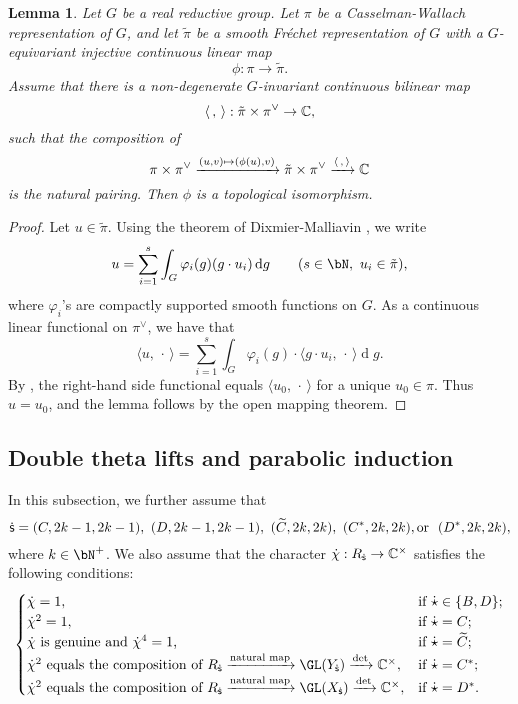 \documentclass[12pt,a4paper]{amsart}
\newcommand{\od}{\operatorname{d}}
\newcommand{\la}{\langle}
\newcommand{\ra}{\rangle}
\newcommand{\be}{\begin {equation}}
\newcommand{\ee}{\end {equation}}
\numberwithin{equation}{section}
\newtheorem{lem}[thm]{Lemma}
\theoremstyle{remark}
\begin{document}
\begin{lem}\label{imb2}
Let $G$ be a real reductive group. Let $\pi$ be a Casselman-Wallach representation of $G$, and let $\tilde \pi$ be a smooth Fr\'echet representation of $G$ with a $G$-equivariant injective continuous linear map
\[
  \phi: \pi\rightarrow \tilde \pi.
\]
Assume that  there is a non-degenerate $G$-invariant continuous bilinear map
\[
\la\,,\,\ra: \tilde \pi\times \pi^\vee\rightarrow \C,
\]
such that the composition of
\[
 \pi\times \pi^\vee\xrightarrow{(u,v)\mapsto (\phi(u),v)} \tilde \pi\times \pi^\vee\xrightarrow{\la\,,\,\ra} \C
\]
is the natural pairing. Then $\phi$ is a topological isomorphism.
\end{lem}
\begin{proof}
 Let $u\in \tilde \pi$.
 Using the theorem of Dixmier-Malliavin \cite[Theorem 3.3]{DM}, we write
 \[
   u=\sum_{i=1}^{s} \int_G \varphi_i(g) ( g\cdot u_i)\od\! g \qquad (s\in \bN, \ u_i\in\tilde \pi),
 \]
 where $\varphi_i$'s are compactly supported smooth functions on $G$.  As a continuous linear functional on $\pi^\vee$, we have that
  \[
   \la u,\, \cdot\, \ra=\sum_{i=1}^{s} \int_G \varphi_i(g)  \cdot \la g\cdot u_i, \,\cdot\,\ra \od\! g.
 \]
By \cite[Lemma 3.5]{SZ1},  the right-hand side  functional  equals  $\la u_0, \,\cdot\,\ra$ for a unique $u_0\in \pi$. Thus $u=u_0$, and the lemma follows by the open mapping theorem.
\end{proof}

\subsection{Double theta lifts and parabolic induction}
In this subsection, we further assume that
\[
 \dsfss= (C, 2k-1, 2k-1), \ (D, 2k-1, 2k-1), \ (\widetilde C, 2k, 2k), \ (C^*, 2k, 2k), \textrm{or }\ (D^*, 2k, 2k),
\]
where $k\in \bN^+$.
We also assume that the character $\dot \chi: R_{{\dot{\mathsf s}}}\rightarrow \mathbb{C}^\times $
satisfies  the following conditions:
\be\label{chid}
\begin{cases}
  \dot \chi=1,\quad   &\textrm{if }\dot \star\in \{B,D\};\\
 \dot \chi^2=1,  & \textrm{if $\dot \star=C$;}\\
 \dot \chi \textrm{ is genuine and $\dot \chi^4=1$,}& \textrm{if $\dot \star=\widetilde C$};\\
  \dot \chi^2\textrm{ equals the composition of $R_\dsfss\xrightarrow{\textrm{natural map}} \GL(Y_\dsfss)\xrightarrow{\det}\C^\times$},  & \textrm{if $\dot \star=C^*$;}\\
   \dot \chi^2\textrm{ equals the composition of $R_\dsfss\xrightarrow{\textrm{natural map}} \GL(X_\dsfss)\xrightarrow{\det}\C^\times$},  & \textrm{if $\dot \star=D^*$.}
\end{cases}
\ee
\end{document}
